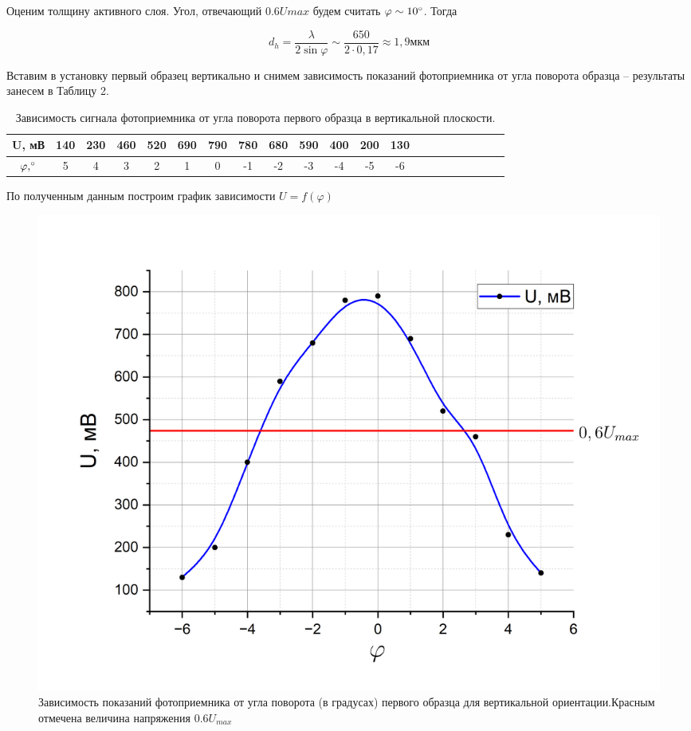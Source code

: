 \documentclass[a4paper,12pt]{article}
\begin{document}
Оценим толщину активного слоя. Угол, отвечающий $0.6U{max}$ будем считать $\varphi \sim 10 \degree$. Тогда

$$
	d_{h} = \frac{\lambda}{2 \sin \varphi} \sim \frac{650}{2 \cdot 0,17 } \approx 1,9 \text{мкм}
$$

\newpage

Вставим в установку первый образец вертикально и снимем зависимость показаний фотоприемника от угла поворота образца -- результаты занесем в Таблицу 2.

\begin{table}[h!]
\centering
\caption{Зависимость сигнала фотоприемника от угла поворота первого образца в вертикальной плоскости.}
\begin{tabular}{|c|c|c|c|c|c|c|c|c|c|c|c|c|c|c|c|c|c|c|c|c|}
\hline
U, мВ & 140 & 230 & 460 & 520 & 690 & 790 & 780 & 680 & 590 & 400 & 200 & 130 \\ \hline
$\varphi, \degree$    & 5   & 4   & 3   & 2   & 1   & 0   & -1  & -2  & -3  & -4  & -5  & -6  \\ \hline
\end{tabular}
\end{table}

По полученным данным построим график зависимости $U = f(\varphi)$

\begin{figure}[h!]
	\centering
	\includegraphics[width=0.95\linewidth]{Vertical}
	\caption{Зависимость показаний фотоприемника от угла поворота (в градусах) первого образца для вертикальной ориентации.Красным отмечена величина напряжения $0.6 U_{max}$}
\end{figure}
\end{document}

